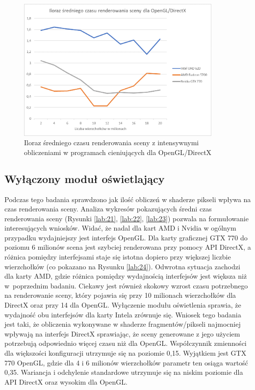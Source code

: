 \documentclass[archive]{mgr}
\begin{document}
\begin{figure}[h!]
  \centering
    \includegraphics[width=0.9\textwidth]{images/shaderon/4.png}
   \caption{Iloraz średniego czasu renderowania sceny z intensywnymi obliczeniami w programach cieniujących dla OpenGL/DirectX}
   \label{lab:14}
\end{figure}

\subsection{Wyłączony moduł oświetlający}



Podczas tego badania sprawdzono jak ilość obliczeń w shaderze pikseli wpływa na czas renderowania sceny. Analiza wykresów pokazujących średni czas renderowania sceny (Rysunki \ref{lab:21}, \ref{lab:22}, \ref{lab:23}) pozwala na  formułowanie interesujących wniosków. Widać, że nadal dla kart AMD i Nvidia w ogólnym przypadku wydajniejszy jest interfejs OpenGL. Dla karty graficznej GTX 770 do poziomu 6 milionów scena jest szybciej renderowana przy pomocy API DirectX, a różnica pomiędzy interfejsami staje się istotna dopiero przy większej liczbie wierzchołków (co pokazano na Rysunku \ref{lab:24}). Odwrotna sytuacja zachodzi dla karty AMD, gdzie różnica pomiędzy wydajnością interfejsów jest większa niż w~poprzednim badaniu. Ciekawy jest również skokowy wzrost czasu potrzebnego na renderowanie sceny, który pojawia się przy 10 milionach wierzchołków dla DirectX oraz przy 14 dla OpenGL. Wyłączenie modułu oświetlenia sprawia, że wydajność obu interfejsów dla karty Intela zrównuje się. Wniosek tego badania jest taki, że obliczenia wykonywane w shaderze fragmentów/pikseli najmocniej wpływają na interfejs DirectX sprawiając, że sceny generowane z jego użyciem potrzebują odpowiednio więcej czasu niż dla OpenGL. Współczynnik zmienności dla większości konfiguracji utrzymuje się na poziomie 0,15. Wyjątkiem jest GTX 770 OpenGL, gdzie dla 4 i 6 milionów wierzchołków parametr ten osiąga wartość 0,35. Wariancja i odchylenie standardowe utrzymuje się na niskim poziomie dla API DirectX oraz wysokim dla OpenGL.
\end{document}
